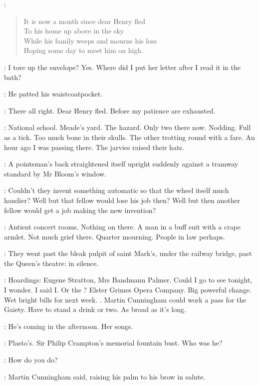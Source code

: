 :
\begin{verse}
    It is now a month since dear Henry fled \\
    To his home up above in the sky \\
    While his family weeps and mourns his loss \\
    Hoping some day to meet him on high.
\end{verse}

\BloomInt:
I tore up the envelope?
Yes.
Where did I put her letter after I read it in the bath?

:
He patted his waistcoatpocket.

\BloomInt:
There all right.
Dear Henry fled.
Before my patience are exhausted.

\BloomInt:
National school.
Meade's yard.
The hazard.
Only two there now.
Nodding.
Full as a tick.
Too much bone in their skulls.
The other trotting round with a fare.
An hour ago I was passing there.
The jarvies raised their hats.

:
A pointsman's back straightened itself upright
suddenly against a tramway standard
by Mr Bloom's window.

\BloomInt:
Couldn't they invent something automatic so that the wheel itself much handier?
Well but that fellow would lose his job then?
Well but then another fellow would get a job making the new invention?

\BloomInt:
Antient concert rooms.
Nothing on there.
A man in a buff suit with a crape armlet.
Not much grief there.
Quarter mourning.
People in law perhaps.

:
They went past the bleak pulpit of saint Mark's,
under the railway bridge,
past the Queen's theatre:
in silence.

\BloomInt:
Hoardings:
Eugene Stratton,
Mrs Bandmann Palmer.
Could I go to see  tonight, I wonder.
I said I.
Or the ?
Elster Grimes Opera Company.
Big powerful change.
Wet bright bills for next week.
.
Martin Cunningham could work a pass for the Gaiety.
Have to stand a drink or two.
As broad as it's long.

\BloomInt:
He's coming in the afternoon.
Her songs.

\BloomInt:
Plasto's.
Sir Philip Crampton's memorial fountain bust.
Who was he?

\cunningham:
How do you do?

:
Martin Cunningham said,
raising his palm to his brow in salute.

